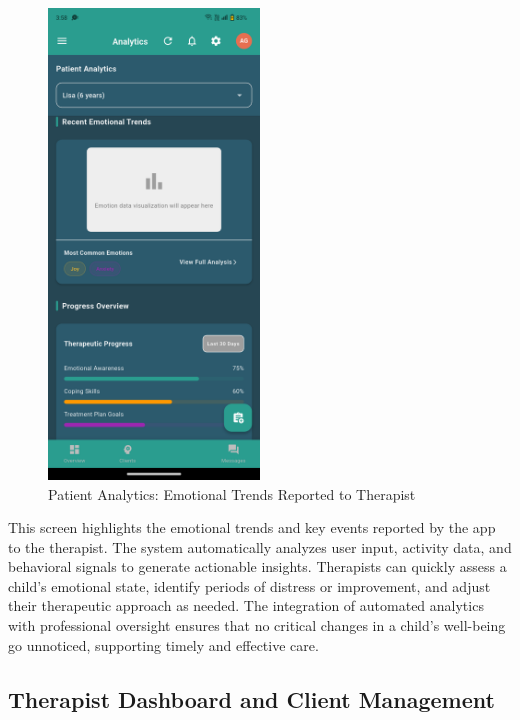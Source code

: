 ﻿\documentclass[12pt,a4paper]{article}
\newcommand{\sectiontitle}[1]{\subsection{#1}}
\begin{document}
\begin{figure}[H]
    \centering
    \includegraphics[width=0.5\textwidth]{Screenshots/patientanalyticsthatreportsemotionaltrendsofchildtotherapist.png}
    \caption{Patient Analytics: Emotional Trends Reported to Therapist}
    \label{fig:patient-analytics-therapist}
\end{figure}
This screen highlights the emotional trends and key events reported by the app to the therapist. The system automatically analyzes user input, activity data, and behavioral signals to generate actionable insights. Therapists can quickly assess a child's emotional state, identify periods of distress or improvement, and adjust their therapeutic approach as needed. The integration of automated analytics with professional oversight ensures that no critical changes in a child's well-being go unnoticed, supporting timely and effective care.

\sectiontitle{Therapist Dashboard and Client Management}
\end{document}
